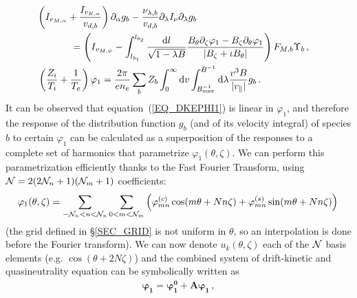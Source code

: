 \begin{eqnarray}
\left(I_{v_{M,\alpha}} +\frac{I_{v_{E,\alpha}}}{v_{d,b}}\right)\partial_\alpha g_b-\frac{\nu_{\lambda,b}}{v_{d,b}} \partial_\lambda I_\nu \partial_\lambda g_b ~~~~~~~~~~~~~~~~~~~~~~~~~~~~~~~~~~~& &\nonumber\\=\left(I_{v_{M,\psi}}-\int_{l_{b_1}}^{l_{b_2}} \frac{\mathrm{d}l}{\sqrt{1-\lambda B}}\frac{B_\theta\partial_\zeta \varphi_1 - B_\zeta\partial_\theta \varphi_1}{|B_\zeta+\iota B_\theta|} \right) F_{M,b}\Upsilon_b\,,\label{EQ_DKEPHI1}\\
\left(\frac{Z_i}{T_i}+\frac{1}{T_e}\right)\varphi_1 =\frac{2\pi}{en_e}\sum_b Z_b \int_0^\infty\mathrm{d} v \int_{B^{-1}_{{\rm max}}}^{B^{-1}}\mathrm{d}\lambda\frac{v^3 B}{|v_\parallel |}g_b\,.~~~~~~~~~~~~~~~\label{EQ_QNPHI1}
\end{eqnarray}
It can be observed that equation~(\ref{EQ_DKEPHI1}) is linear in $\varphi_1$, and therefore the response of the distribution function $g_b$ (and of its velocity integral) of species $b$ to certain $\varphi_1$ can be calculated as a superposition of the responses to a complete set of harmonics that parametrize $\varphi_1(\theta,\zeta)$. We can perform this parametrization efficiently thanks to the Fast Fourier Transform, using ${\cal{N}}=2(2{\cal{N}}_n+1)({\cal{N}}_m+1)$ coefficients:
\begin{equation}
\varphi_1(\theta,\zeta) =\sum_{-{\cal{N}}_n<n<{\cal{N}}_n} \sum_{0<m<{\cal{N}}_m} \left(\varphi^{(c)}_{mn}\cos(m\theta+Nn\zeta)+\varphi^{(s)}_{mn}\sin(m\theta+Nn\zeta)\right)\,
\label{EQ_FFTPHI1}
\end{equation}
(the grid defined in \S\ref{SEC_GRID} is not uniform in $\theta$, so an interpolation is done before the Fourier transform). We can now denote $u_k(\theta,\zeta)$ each of the ${\cal{N}}$ basis elements (e.g. $\cos(\theta+2N\zeta)$) and the combined system of drift-kinetic and quasineutrality equation can be symbolically written as
\begin{eqnarray}
\pmb{\varphi_1} = \pmb{\varphi_1^{0}} + \mathbf{A}\pmb{\varphi_1}\,,
\end{eqnarray}
